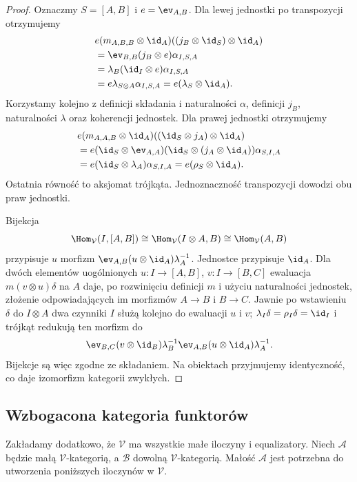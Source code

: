\begin{proof}
Oznaczmy $S=[A,B]$ i $e=\ev_{A,B}$. Dla lewej jednostki po transpozycji otrzymujemy
\[
\begin{aligned}
 &e(m_{A,B,B}\otimes\id_A)
 ((j_B\otimes\id_S)\otimes\id_A)\\
 &=\ev_{B,B}(j_B\otimes e)\alpha_{I,S,A}\\
 &=\lambda_B(\id_I\otimes e)\alpha_{I,S,A}\\
 &=e\lambda_{S\otimes A}\alpha_{I,S,A}
 =e(\lambda_S\otimes\id_A).
\end{aligned}
\]
Korzystamy kolejno z definicji składania i naturalności $\alpha$, definicji $j_B$, naturalności $\lambda$ oraz koherencji jednostek. Dla prawej jednostki otrzymujemy
\[
\begin{aligned}
 &e(m_{A,A,B}\otimes\id_A)
 ((\id_S\otimes j_A)\otimes\id_A)\\
 &=e(\id_S\otimes\ev_{A,A})
   (\id_S\otimes(j_A\otimes\id_A))\alpha_{S,I,A}\\
 &=e(\id_S\otimes\lambda_A)\alpha_{S,I,A}
 =e(\rho_S\otimes\id_A).
\end{aligned}
\]
Ostatnia równość to aksjomat trójkąta. Jednoznaczność transpozycji dowodzi obu praw jednostki.

Bijekcja
\[
 \Hom_{\mathcal V}(I,[A,B])\cong
 \Hom_{\mathcal V}(I\otimes A,B)\cong\Hom_{\mathcal V}(A,B)
\]
przypisuje $u$ morfizm $\ev_{A,B}(u\otimes\id_A)\lambda_A^{-1}$. Jednostce przypisuje $\id_A$. Dla dwóch elementów uogólnionych $u:I\to[A,B]$, $v:I\to[B,C]$ ewaluacja $m(v\otimes u)\delta$ na $A$ daje, po rozwinięciu definicji $m$ i użyciu naturalności jednostek, złożenie odpowiadających im morfizmów $A\to B$ i $B\to C$. Jawnie po wstawieniu $\delta$ do $I\otimes A$ dwa czynniki $I$ służą kolejno do ewaluacji $u$ i $v$; $\lambda_I\delta=\rho_I\delta=\id_I$ i trójkąt redukują ten morfizm do
\[
 \ev_{B,C}(v\otimes\id_B)\lambda_B^{-1}
 \ev_{A,B}(u\otimes\id_A)\lambda_A^{-1}.
\]
Bijekcje są więc zgodne ze składaniem. Na obiektach przyjmujemy identyczność, co daje izomorfizm kategorii zwykłych.
\end{proof}

\subsection{Wzbogacona kategoria funktorów}

Zakładamy dodatkowo, że $\mathcal V$ ma wszystkie małe iloczyny i equalizatory. Niech $\mathcal A$ będzie małą $\mathcal V$-kategorią, a $\mathcal B$ dowolną $\mathcal V$-kategorią. Małość $\mathcal A$ jest potrzebna do utworzenia poniższych iloczynów w $\mathcal V$.

